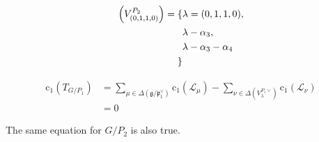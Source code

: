 \documentclass[uplatex,dvipdfmx]{jsarticle}
\begin{document}
\begin{equation}
    \begin{alignedat}
        \Delta\left( V^{P_2}_{(0, 1, 1, 0)} \right)
        =
        \{
            &\lambda = (0, 1, 1, 0),\\
            &\lambda - \alpha_3,\\
            &\lambda - \alpha_3 - \alpha_4\\
        \}
    \end{alignedat}
\end{equation}

\begin{align}
    \mathrm{c}_1(T_{G/P_1})
    &=
    \sum_{\mu \in \Delta(\mathfrak{g}/\mathfrak{p}_1^\vee)}\mathrm{c}_1(\mathcal{L}_\mu)
    -
    \sum_{\nu \in \Delta(V^{P_1\vee}_\lambda)}\mathrm{c}_1(\mathcal{L}_\nu)\\
    &=
    0
\end{align}

The same equation for
$G/P_2$
is also true.
\end{document}
